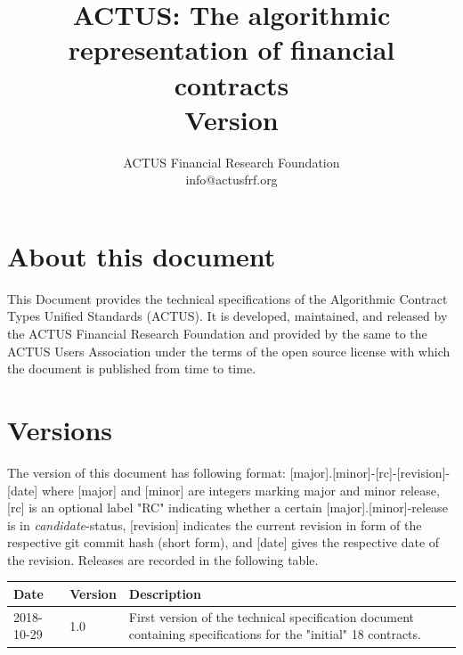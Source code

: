 \documentclass[9pt,oneside]{amsart}
\title{ACTUS: The algorithmic representation of financial contracts \\
      {\smaller \textbf{Version \VersionNumber}}}
\author{
    ACTUS Financial Research Foundation\\
    info@actusfrf.org
}
\begin{document}
%

\maketitle




\section*{About this document}\label{sec:about}

This Document provides the technical specifications of the Algorithmic Contract Types Unified Standards (ACTUS). It is developed, maintained, and released by the ACTUS Financial Research Foundation and provided by the same to the ACTUS Users Association under the terms of the open source license with which the document is published from time to time.



\section*{Versions}\label{sec:version}

The version of this document has following format: [major].[minor]-[rc]-[revision]-[date] where [major] and [minor] are integers marking major and minor release, [rc] is an optional label "RC" indicating whether a certain [major].[minor]-release is in \textit{candidate}-status, [revision] indicates the current revision in form of the respective git commit hash (short form), and [date] gives the respective date of the revision. Releases are recorded in the following table.

\begin{table}[H]
  \centering
  \begin{tabular}{| p{} | p{} | p{} |}
  \hline
  Date & Version & Description \\ 
  \hline
  2018-10-29 & 1.0 & First version of the technical specification document containing specifications for the "initial" 18 contracts.\\
  \hline
  \end{tabular}
\end{table}
\end{document}
